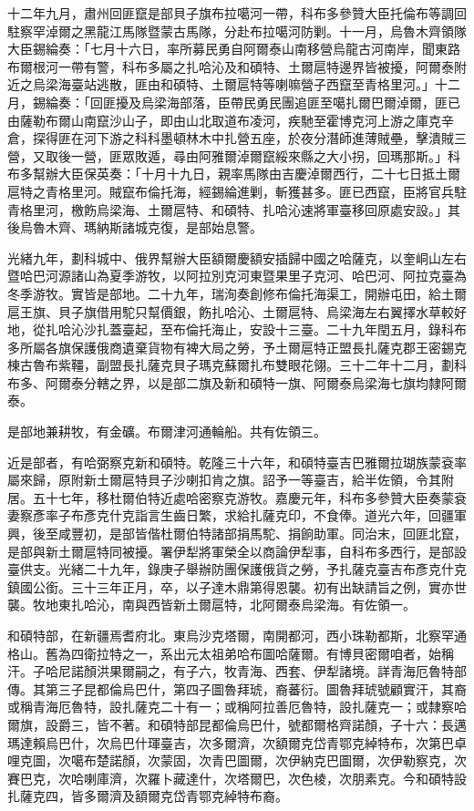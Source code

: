 \begin{pinyinscope}
十二年九月，肅州回匪竄是部貝子旗布拉噶河一帶，科布多參贊大臣托倫布等調回駐察罕淖爾之黑龍江馬隊暨蒙古馬隊，分赴布拉噶河防剿。十一月，烏魯木齊領隊大臣錫綸奏：「七月十六日，率所募民勇自阿爾泰山南移營烏龍古河南岸，聞東路布爾根河一帶有警，科布多屬之扎哈沁及和碩特、土爾扈特邊界皆被擾，阿爾泰附近之烏梁海臺站逃散，匪由和碩特、土爾扈特等喇嘛營子西竄至青格里河。」十二月，錫綸奏：「回匪擾及烏梁海部落，臣帶民勇民團追匪至噶扎爾巴爾淖爾，匪已由薩勒布爾山南竄沙山子，即由山北取道布凌河，疾馳至霍博克河上游之庫克辛倉，探得匪在河下游之科科墨頓林木中扎營五座，於夜分潛師進薄賊壘，擊潰賊三營，又取後一營，匪眾敗遁，尋由阿雅爾淖爾竄綏來縣之大小拐，回瑪那斯。」科布多幫辦大臣保英奏：「十月十九日，親率馬隊由吉慶淖爾西行，二十七日抵土爾扈特之青格里河。賊竄布倫托海，經錫綸進剿，斬獲甚多。匪已西竄，臣將官兵駐青格里河，檄飭烏梁海、土爾扈特、和碩特、扎哈沁速將軍臺移回原處安設。」其後烏魯木齊、瑪納斯諸城克復，是部始息警。

光緒九年，劃科城中、俄界幫辦大臣額爾慶額安插歸中國之哈薩克，以奎峒山左右暨哈巴河源諸山為夏季游牧，以阿拉別克河東暨果里子克河、哈巴河、阿拉克臺為冬季游牧。實皆是部地。二十九年，瑞洵奏創修布倫托海渠工，開辦屯田，給土爾扈王旗、貝子旗借用駝只幫價銀，飭扎哈沁、土爾扈特、烏梁海左右翼擇水草較好地，從扎哈沁沙扎蓋臺起，至布倫托海止，安設十三臺。二十九年閏五月，錄科布多所屬各旗保護俄商遺棄貨物有裨大局之勞，予土爾扈特正盟長扎薩克郡王密錫克棟古魯布紫韁，副盟長扎薩克貝子瑪克蘇爾扎布雙眼花翎。三十二年十二月，劃科布多、阿爾泰分轄之界，以是部二旗及新和碩特一旗、阿爾泰烏梁海七旗均隸阿爾泰。

是部地兼耕牧，有金礦。布爾津河通輪船。共有佐領三。

近是部者，有哈弼察克新和碩特。乾隆三十六年，和碩特臺吉巴雅爾拉瑚族蒙袞率屬來歸，原附新土爾扈特貝子沙喇扣肯之旗。詔予一等臺吉，給半佐領，令其附居。五十七年，移杜爾伯特近處哈密察克游牧。嘉慶元年，科布多參贊大臣奏蒙袞妻察彥率子布彥克什克詣言生齒日繁，求給扎薩克印，不食俸。道光六年，回疆軍興，後至咸豐初，是部皆偕杜爾伯特諸部捐馬駝、捐餉助軍。同治末，回匪北竄，是部與新土爾扈特同被擾。署伊犁將軍榮全以商論伊犁事，自科布多西行，是部設臺供支。光緒二十九年，錄庚子舉辦防團保護俄貨之勞，予扎薩克臺吉布彥克什克鎮國公銜。三十三年正月，卒，以子達木鼎第得恩襲。初有出缺請旨之例，實亦世襲。牧地東扎哈沁，南與西皆新土爾扈特，北阿爾泰烏梁海。有佐領一。

和碩特部，在新疆焉耆府北。東烏沙克塔爾，南開都河，西小珠勒都斯，北察罕通格山。舊為四衛拉特之一，系出元太祖弟哈布圖哈薩爾。有博貝密爾咱者，始稱汗。子哈尼諾顏洪果爾嗣之，有子六，牧青海、西套、伊犁諸境。詳青海厄魯特部傳。其第三子昆都倫烏巴什，第四子圖魯拜琥，裔蕃衍。圖魯拜琥號顧實汗，其裔或稱青海厄魯特，設扎薩克二十有一；或稱阿拉善厄魯特，設扎薩克一；或隸察哈爾旗，設爵三，皆不著。和碩特部昆都倫烏巴什，號都爾格齊諾顏，子十六：長邁瑪達賴烏巴什，次烏巴什琿臺吉，次多爾濟，次額爾克岱青鄂克綽特布，次第巴卓哩克圖，次噶布楚諾顏，次蒙固，次青巴圖爾，次伊納克巴圖爾，次伊勒察克，次賽巴克，次哈喇庫濟，次羅卜藏達什，次塔爾巴，次色棱，次朋素克。今和碩特設扎薩克四，皆多爾濟及額爾克岱青鄂克綽特布裔。


\end{pinyinscope}
